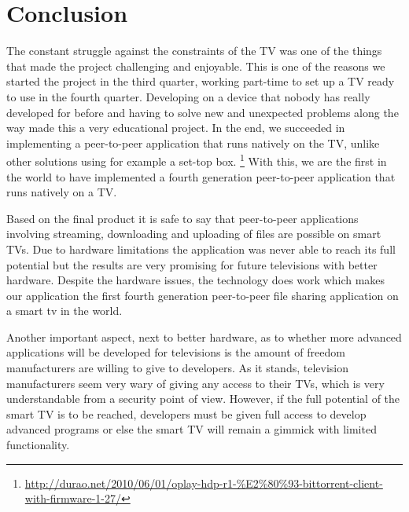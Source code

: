 \chapter{Conclusion}
The constant struggle against the constraints of the TV was one of the things that made the project challenging and enjoyable. This is one of the reasons we started the project in the third quarter, working part-time to set up a TV ready to use in the fourth quarter. Developing on a device that nobody has really developed for before and having to solve new and unexpected problems along the way made this a very educational project.
In the end, we succeeded in implementing a peer-to-peer application that runs natively on the TV, unlike other solutions using for example a set-top box. \footnote{\url{http://durao.net/2010/06/01/oplay-hdp-r1-\%E2\%80\%93-bittorrent-client-with-firmware-1-27/}}
With this, we are the first in the world to have implemented a fourth generation peer-to-peer application that runs natively on a TV.

Based on the final product it is safe to say that peer-to-peer applications involving streaming, downloading and uploading of files are possible on smart TV\textquotesingle s. Due to hardware limitations the application was never able to reach its full potential but the results are very promising for future televisions with better hardware. Despite the hardware issues, the technology does work which makes our application the first fourth generation peer-to-peer file sharing application on a smart tv in the world.

Another important aspect, next to better hardware, as to whether more advanced applications will be developed for televisions is the amount of freedom manufacturers are willing to give to developers. As it stands, television manufacturers seem very wary of giving any access to their TV\textquotesingle s, which is very understandable from a security point of view. However, if the full potential of the smart TV is to be reached, developers must be given full access to develop advanced programs or else the smart TV will remain a gimmick with limited functionality.
